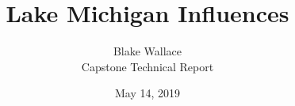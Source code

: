 \documentclass[10pt]{article}
\renewcommand{\qedsymbol}{$\blacksquare$} %
\begin{document}
 
 
 
\title{Lake Michigan Influences}%
\author{Blake Wallace\\ %
Capstone Technical Report} %
\date{May 14, 2019}
 
\maketitle

\vspace{2mm}
\end{document}
